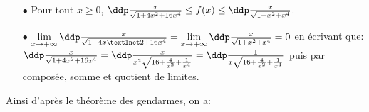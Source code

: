 \documentclass[a4paper, 11pt,reqno]{article}
\begin{document}
\begin{correction}
\begin{itemize}
		      \begin{itemize}
			      \item[$\bullet$] Pour tout $x\geq 0$, $\ddp\frac{x}{\sqrt{1+4x^2+16x^4}}\leq f(x)\leq \ddp\frac{x}{\sqrt{1+x^2+x^4}}$.
			      \item[$\bullet$] $\lim\limits_{x\to +\infty} \ddp\frac{x}{\sqrt{1+4x¬2+16x^4}}=\lim\limits_{x\to +\infty} \ddp\frac{x}{\sqrt{1+x^2+x^4}}=0$ en \'ecrivant que: $\ddp\frac{x}{\sqrt{1+4x^2+16x^4}}=\ddp\frac{x}{x^2\sqrt{16+\frac{4}{x^2}+\frac{1}{x^4}}}=\ddp\frac{1}{x\sqrt{16+\frac{4}{x^2}+\frac{1}{x^4}}}$ puis par compos\'ee, somme et quotient de limites.
		      \end{itemize}
		      Ainsi d'apr\`{e}s le th\'eor\`{e}me des gendarmes, on a: 
	\end{itemize}
\end{correction}
\end{document}
